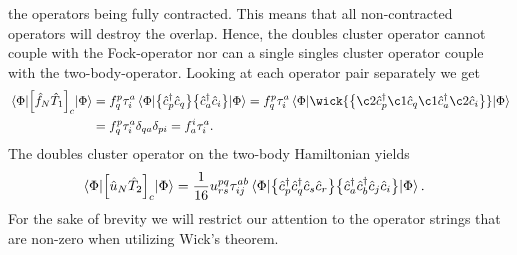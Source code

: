         the operators being fully contracted.
        This means that all non-contracted operators will destroy the overlap.
        Hence, the doubles cluster operator cannot couple with the Fock-operator
        nor can a single singles cluster operator couple with the
        two-body-operator.
        Looking at each operator pair separately we get
        \begin{align}
            \mel{\slat}{
                \brak{
                    \fock_N\clust_1
                }_c
            }{\slat}
            &=
            \fockten^{p}_{q}\clustamp^{a}_{i}
            \mel{\slat}{
                \normalord{
                    \ccr{p}\can{q}
                }\normalord{
                    \ccr{a}
                    \can{i}
                }
            }{\slat}
            =
            \fockten^{p}_{q}\clustamp^{a}_{i}
            \mel{\slat}{
                \wick{
                    \normalord{
                        \c2 {\ccr{p}}
                        \c1 {\can{q}}
                        \c1 {\ccr{a}}
                        \c2 {\can{i}}
                    }
                }
            }{\slat}
            \\
            &=
            \fockten^{p}_{q}\clustamp^{a}_{i}
            \delta_{qa}\delta_{pi}
            = \fockten^{i}_{a}\clustamp^{a}_{i}.
        \end{align}
        The doubles cluster operator on the two-body Hamiltonian yields
        \begin{align}
            \mel{\Phi}{\left[ 
                \hat{u}_N \hat{T}_2
             \right]_c}{\Phi}
            &=
            \frac{1}{16}u^{pq}_{rs}\tau^{ab}_{ij}
            \mel{\Phi}{
                \bigl\{ 
                    \hat{c}_{p}^{\dagger}
                    \hat{c}_{q}^{\dagger}
                    \hat{c}_{s}
                    \hat{c}_{r}
                 \bigr\}
                \bigl\{ 
                    \hat{c}_{a}^{\dagger}
                    \hat{c}_{b}^{\dagger}
                    \hat{c}_{j}
                    \hat{c}_{i}
                 \bigr\}
            }{\Phi}.
        \end{align}
        For the sake of brevity we will restrict our attention to the operator
        strings that are non-zero when utilizing Wick's theorem.

